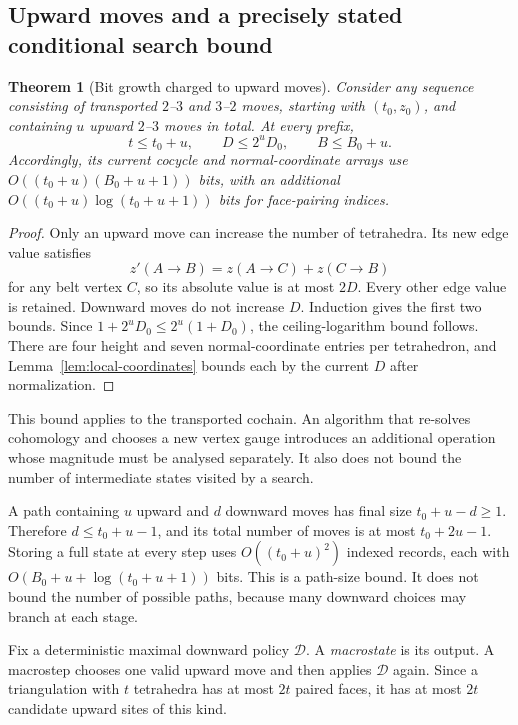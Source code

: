\documentclass[11pt,letterpaper]{article}
\newtheorem{theorem}{Theorem}[section]
\theoremstyle{definition}
\theoremstyle{remark}
\begin{document}
\subsection{Upward moves and a precisely stated conditional search bound}

\begin{theorem}[Bit growth charged to upward moves]
\label{thm:upward}
Consider any sequence consisting of transported $2$--$3$ and $3$--$2$
moves, starting with $(t_0,z_0)$, and containing $u$ upward $2$--$3$ moves
in total. At every prefix,
\[
 t\le t_0+u,\qquad D\le 2^uD_0,
 \qquad B\le B_0+u.
\]
Accordingly, its current cocycle and normal-coordinate arrays use
$O((t_0+u)(B_0+u+1))$ bits, with an additional
$O((t_0+u)\log(t_0+u+1))$ bits for face-pairing indices.
\end{theorem}
\begin{proof}
Only an upward move can increase the number of tetrahedra. Its new edge
value satisfies
\[
 z'(A\to B)=z(A\to C)+z(C\to B)
\]
for any belt vertex $C$, so its absolute value is at most $2D$.
Every other edge value is retained. Downward moves do not increase $D$.
Induction gives the first two bounds. Since
$1+2^uD_0\le 2^u(1+D_0)$, the ceiling-logarithm bound follows. There are
four height and seven normal-coordinate entries per tetrahedron, and
Lemma~\ref{lem:local-coordinates} bounds each by the current $D$ after
normalization.
\end{proof}

This bound applies to the transported cochain. An algorithm that re-solves
cohomology and chooses a new vertex gauge introduces an additional operation
whose magnitude must be analysed separately. It also does not bound the
number of intermediate states visited by a search.

A path containing $u$ upward and $d$ downward moves has final size
$t_0+u-d\ge1$. Therefore $d\le t_0+u-1$, and its total number of moves
is at most $t_0+2u-1$. Storing a full state at every step uses
$O((t_0+u)^2)$ indexed records, each with
$O(B_0+u+\log(t_0+u+1))$ bits. This is a path-size bound. It does not
bound the number of possible paths, because many downward choices may
branch at each stage.

Fix a deterministic maximal downward policy $\mathcal D$. A
\emph{macrostate} is its output. A macrostep chooses one valid upward
move and then applies $\mathcal D$ again. Since a triangulation with $t$
tetrahedra has at most $2t$ paired faces, it has at most $2t$ candidate
upward sites of this kind.
\end{document}
